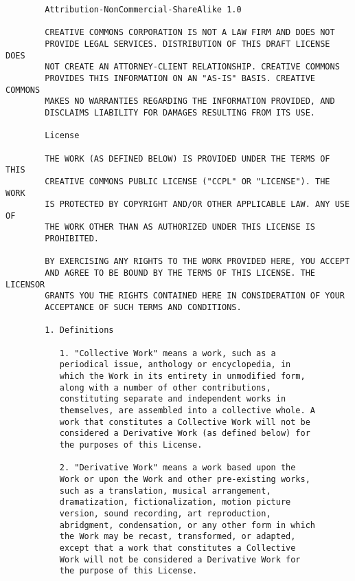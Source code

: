\begin{verbatim}
        Attribution-NonCommercial-ShareAlike 1.0
        
        CREATIVE COMMONS CORPORATION IS NOT A LAW FIRM AND DOES NOT
        PROVIDE LEGAL SERVICES. DISTRIBUTION OF THIS DRAFT LICENSE DOES
        NOT CREATE AN ATTORNEY-CLIENT RELATIONSHIP. CREATIVE COMMONS
        PROVIDES THIS INFORMATION ON AN "AS-IS" BASIS. CREATIVE COMMONS
        MAKES NO WARRANTIES REGARDING THE INFORMATION PROVIDED, AND
        DISCLAIMS LIABILITY FOR DAMAGES RESULTING FROM ITS USE.
        
        License
        
        THE WORK (AS DEFINED BELOW) IS PROVIDED UNDER THE TERMS OF THIS
        CREATIVE COMMONS PUBLIC LICENSE ("CCPL" OR "LICENSE"). THE WORK
        IS PROTECTED BY COPYRIGHT AND/OR OTHER APPLICABLE LAW. ANY USE OF
        THE WORK OTHER THAN AS AUTHORIZED UNDER THIS LICENSE IS
        PROHIBITED.
        
        BY EXERCISING ANY RIGHTS TO THE WORK PROVIDED HERE, YOU ACCEPT
        AND AGREE TO BE BOUND BY THE TERMS OF THIS LICENSE. THE LICENSOR
        GRANTS YOU THE RIGHTS CONTAINED HERE IN CONSIDERATION OF YOUR
        ACCEPTANCE OF SUCH TERMS AND CONDITIONS.
        
        1. Definitions

           1. "Collective Work" means a work, such as a
           periodical issue, anthology or encyclopedia, in
           which the Work in its entirety in unmodified form,
           along with a number of other contributions,
           constituting separate and independent works in
           themselves, are assembled into a collective whole. A
           work that constitutes a Collective Work will not be
           considered a Derivative Work (as defined below) for
           the purposes of this License.
        
           2. "Derivative Work" means a work based upon the
           Work or upon the Work and other pre-existing works,
           such as a translation, musical arrangement,
           dramatization, fictionalization, motion picture
           version, sound recording, art reproduction,
           abridgment, condensation, or any other form in which
           the Work may be recast, transformed, or adapted,
           except that a work that constitutes a Collective
           Work will not be considered a Derivative Work for
           the purpose of this License.
        

\end{verbatim}
